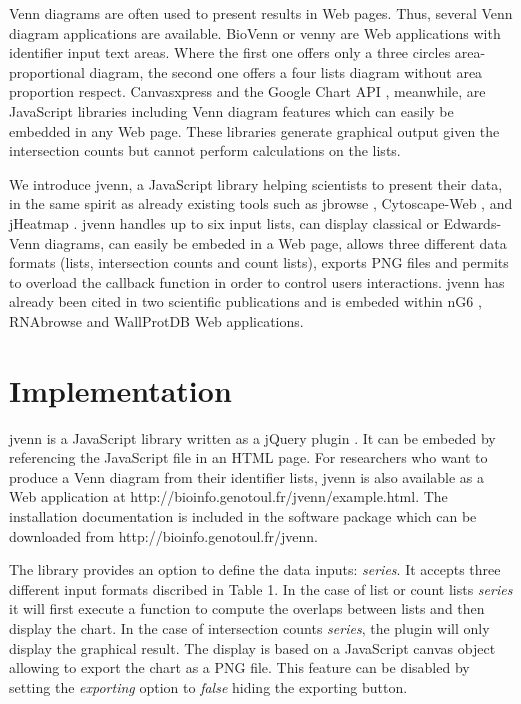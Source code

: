 \documentclass{bmcart}
\begin{document}
Venn diagrams are often used to present results in Web pages. Thus, several Venn diagram applications are 
available. BioVenn \cite{Hulsen2008} or venny \cite{venny} are Web applications with identifier input text 
areas. Where the first one offers only a three circles area-proportional diagram, the second one offers a 
four lists diagram without area proportion respect. Canvasxpress \cite{canvasxpress} and the Google Chart 
API \cite{googleAPI}, meanwhile, are JavaScript libraries including Venn diagram features which can easily 
be embedded in any Web page. These libraries generate graphical output given the intersection counts but 
cannot perform calculations on the lists.
\cite{Bronwen2012}
\cite{RVennDiagram}


We introduce jvenn, a JavaScript library helping scientists to present their data, in the same spirit as already 
existing tools such as jbrowse \cite{Westesson01032013}, Cytoscape-Web \cite{Lopes2010}, and jHeatmap \cite{DeuPons2014}. 
jvenn handles up to six input lists, can display classical or Edwards-Venn \cite{Edwards2004} diagrams, can easily be 
embeded in a Web page, allows three different data formats (lists, intersection counts and count lists), exports PNG files and permits 
to overload the callback function in order to control users interactions. jvenn has already been cited in two scientific 
publications \cite{Bianchia2013, Aravindraja2013} and is embeded within nG6 \cite{Mariette2012}, RNAbrowse \cite{Mariette} and 
WallProtDB \cite{SanClemente} Web applications.


\section*{Implementation}

jvenn is a JavaScript library written as a jQuery plugin \cite{jquery}. It can be embeded by referencing the JavaScript file 
in an HTML page. For researchers who want to produce a Venn diagram from their identifier lists, jvenn is also available as a 
Web application at http://bioinfo.genotoul.fr/jvenn/example.html. The installation documentation is included in the software package 
which can be downloaded from http://bioinfo.genotoul.fr/jvenn.

The library provides an option to define the data inputs: \textit{series}. It accepts three different input formats discribed in 
Table 1. In the case of list or count lists \textit{series} it will first execute a function to compute the overlaps between lists and then
display the chart. In the case of intersection counts \textit{series}, the plugin will only display the graphical result. The display 
is based on a JavaScript canvas object allowing to export the chart as a PNG file. This feature can be disabled by setting the \textit{exporting} 
option to \textit{false} hiding the exporting button.
\end{document}
